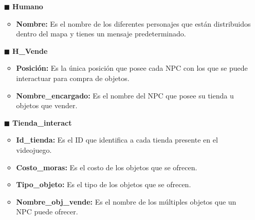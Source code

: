 \documentclass{report}
\begin{document}
\begin{itemize}
\begin{itemize}
        \end{itemize}
    \item[$\blacksquare$]\textbf{Humano}   
        \begin{itemize}
            \item \textbf{Nombre:} Es el nombre de los diferentes personajes que están distribuidos dentro del mapa y tienes un mensaje predeterminado.
        \end{itemize}     
    \item[$\blacksquare$]\textbf{H\_Vende} 
        \begin{itemize}
            \item \textbf{Posición:} Es la única posición que posee cada NPC con los que se puede interactuar para compra de objetos.
            \item \textbf{Nombre\_encargado:} Es el nombre del NPC que posee su tienda u objetos que vender.
        \end{itemize}
    \item[$\blacksquare$]\textbf{Tienda\_interact}  
        \begin{itemize}
            \item \textbf{Id\_tienda:} Es el ID que identifica a cada tienda presente en el videojuego.
            \item \textbf{Costo\_moras:} Es el costo de los objetos que se ofrecen.
            \item \textbf{Tipo\_objeto:} Es el tipo de los objetos que se ofrecen.
            \item \textbf{Nombre\_obj\_vende:} Es el nombre de los múltiples objetos que un NPC puede ofrecer.
        \end{itemize}


\end{itemize}
\end{document}
